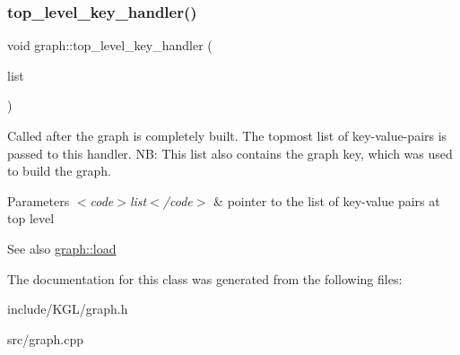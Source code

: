 \subsubsection{\texorpdfstring{top\+\_\+level\+\_\+key\+\_\+handler()}{top\_level\_key\_handler()}}
{\footnotesize\ttfamily void graph\+::top\+\_\+level\+\_\+key\+\_\+handler (\begin{DoxyParamCaption}\item[{\mbox{\hyperlink{struct_k_m_l__pair}{K\+M\+L\+\_\+pair}} $\ast$}]{list }\end{DoxyParamCaption})\hspace{0.3cm}{\ttfamily [virtual]}}

Called after the graph is completely built. The topmost list of key-\/value-\/pairs is passed to this handler. NB\+: This list also contains the graph key, which was used to build the graph.


\begin{DoxyParams}{Parameters}
{\em $<$code$>$list$<$/code$>$} & pointer to the list of key-\/value pairs at top level \\
\hline
\end{DoxyParams}
\begin{DoxySeeAlso}{See also}
\mbox{\hyperlink{classgraph_a35749ff66d1acd6bbef9852df4f39c95}{graph\+::load}} 
\end{DoxySeeAlso}


The documentation for this class was generated from the following files\+:\begin{DoxyCompactItemize}
\item 
include/\+K\+G\+L/graph.\+h\item 
src/graph.\+cpp\end{DoxyCompactItemize}
